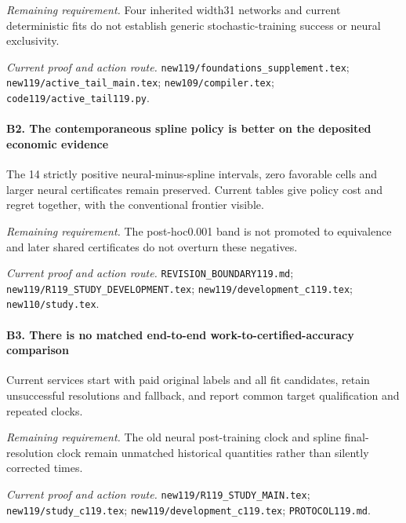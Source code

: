 \par\emph{Remaining requirement.} Four inherited width31 networks and current deterministic fits do not establish generic stochastic-training success or neural exclusivity.

\par\emph{Current proof and action route.} \nolinkurl{new119/foundations_supplement.tex}; \nolinkurl{new119/active_tail_main.tex}; \nolinkurl{new109/compiler.tex}; \nolinkurl{code119/active_tail119.py}.

\paragraph{B2. The contemporaneous spline policy is better on the deposited economic evidence}

The 14 strictly positive neural-minus-spline intervals, zero favorable cells and larger neural certificates remain preserved. Current tables give policy cost and regret together, with the conventional frontier visible.

\par\emph{Remaining requirement.} The post-hoc0.001 band is not promoted to equivalence and later shared certificates do not overturn these negatives.

\par\emph{Current proof and action route.} \nolinkurl{REVISION_BOUNDARY119.md}; \nolinkurl{new119/R119_STUDY_DEVELOPMENT.tex}; \nolinkurl{new119/development_c119.tex}; \nolinkurl{new110/study.tex}.

\paragraph{B3. There is no matched end-to-end work-to-certified-accuracy comparison}

Current services start with paid original labels and all fit candidates, retain unsuccessful resolutions and fallback, and report common target qualification and repeated clocks.

\par\emph{Remaining requirement.} The old neural post-training clock and spline final-resolution clock remain unmatched historical quantities rather than silently corrected times.

\par\emph{Current proof and action route.} \nolinkurl{new119/R119_STUDY_MAIN.tex}; \nolinkurl{new119/study_c119.tex}; \nolinkurl{new119/development_c119.tex}; \nolinkurl{PROTOCOL119.md}.


